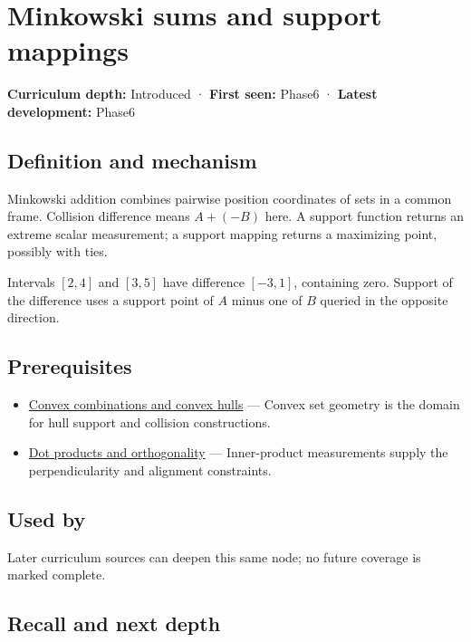 \hypertarget{appendix-215ac7099a82}{}
\section{Minkowski sums and support mappings}\label{appendix-215ac7099a82-minkowski-sums-and-support-mappings}

\textbf{Curriculum depth:} Introduced · \textbf{First seen:} Phase6 · \textbf{Latest development:} Phase6

\subsection{Definition and mechanism}\label{appendix-215ac7099a82-definition-and-mechanism}

Minkowski addition combines pairwise position coordinates of sets in a common frame. Collision difference means \(A+(-B)\) here. A support function returns an extreme scalar measurement; a support mapping returns a maximizing point, possibly with ties.

Intervals \([2,4]\) and \([3,5]\) have difference \([-3,1]\), containing zero. Support of the difference uses a support point of \(A\) minus one of \(B\) queried in the opposite direction.

\subsection{Prerequisites}\label{appendix-215ac7099a82-prerequisites}

\begin{itemize}
\tightlist
\item
  \hyperref[appendix-0026ec42c9d5]{Convex combinations and convex hulls} --- Convex set geometry is the domain for hull support and collision constructions.
\item
  \hyperref[appendix-8bc4e8fc547c]{Dot products and orthogonality} --- Inner-product measurements supply the perpendicularity and alignment constraints.
\end{itemize}

\subsection{Used by}\label{appendix-215ac7099a82-used-by}

Later curriculum sources can deepen this same node; no future coverage is marked complete.

\subsection{Recall and next depth}\label{appendix-215ac7099a82-recall-and-next-depth}

